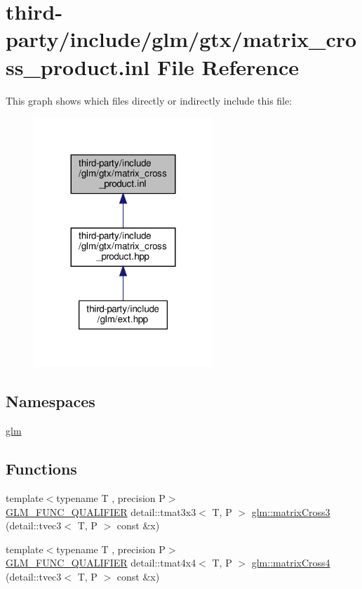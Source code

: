 \hypertarget{matrix__cross__product_8inl}{}\section{third-\/party/include/glm/gtx/matrix\+\_\+cross\+\_\+product.inl File Reference}
\label{matrix__cross__product_8inl}
This graph shows which files directly or indirectly include this file\+:
\nopagebreak
\begin{figure}[H]
\begin{center}
\leavevmode
\includegraphics[width=191pt]{matrix__cross__product_8inl__dep__incl}
\end{center}
\end{figure}
\subsection*{Namespaces}
\begin{DoxyCompactItemize}
\item 
 \hyperlink{namespaceglm}{glm}
\end{DoxyCompactItemize}
\subsection*{Functions}
\begin{DoxyCompactItemize}
\item 
{\footnotesize template$<$typename T , precision P$>$ }\\\hyperlink{setup_8hpp_a33fdea6f91c5f834105f7415e2a64407}{G\+L\+M\+\_\+\+F\+U\+N\+C\+\_\+\+Q\+U\+A\+L\+I\+F\+I\+ER} detail\+::tmat3x3$<$ T, P $>$ \hyperlink{group__gtx__matrix__cross__product_gaebbd4b4436b55c14b6d0b973167a25e4}{glm\+::matrix\+Cross3} (detail\+::tvec3$<$ T, P $>$ const \&x)
\item 
{\footnotesize template$<$typename T , precision P$>$ }\\\hyperlink{setup_8hpp_a33fdea6f91c5f834105f7415e2a64407}{G\+L\+M\+\_\+\+F\+U\+N\+C\+\_\+\+Q\+U\+A\+L\+I\+F\+I\+ER} detail\+::tmat4x4$<$ T, P $>$ \hyperlink{group__gtx__matrix__cross__product_gab3c272adc9c9fc1f7c26d6f353b4bb4b}{glm\+::matrix\+Cross4} (detail\+::tvec3$<$ T, P $>$ const \&x)
\end{DoxyCompactItemize}
